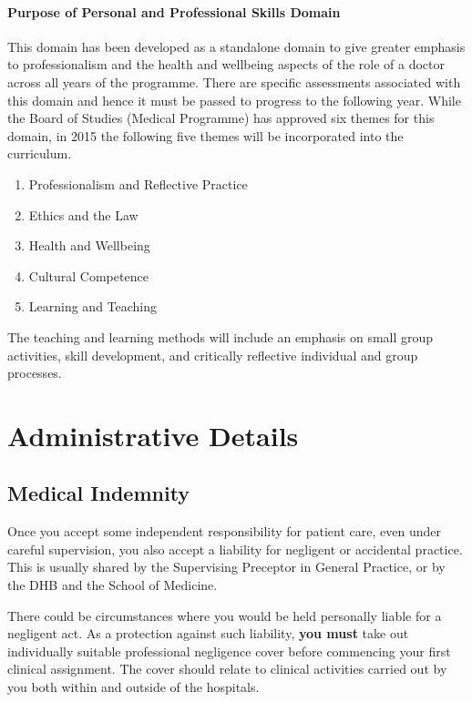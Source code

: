 \documentclass[11pt,fleqn]{book} %
\begin{document}
\subsubsection{Purpose of Personal and Professional Skills Domain}
This domain has been developed as a standalone domain to give greater emphasis to professionalism and the health and wellbeing aspects of the role of a doctor across all years of the programme.  There are specific assessments associated with this domain and hence it must be passed to progress to the following year.  While the Board of Studies (Medical Programme) has approved six themes for this domain, in 2015 the following five themes will be incorporated into the curriculum.
\begin{enumerate}
\item Professionalism and Reflective Practice
\item Ethics and the Law
\item Health and Wellbeing
\item Cultural Competence
\item Learning and Teaching
\end{enumerate}
The teaching and learning methods will include an emphasis on small group activities, skill development, and critically reflective individual and group processes.



\chapter{Administrative Details}

\section{Medical Indemnity}
Once you accept some independent responsibility for patient care, even under careful supervision, you also accept a liability for negligent or accidental practice.  This is usually shared by the Supervising Preceptor in General Practice, or by the DHB and the School of Medicine.

There could be circumstances where you would be held personally liable for a negligent act.  As a protection against such liability, \textbf{you must} take out individually suitable professional negligence cover before commencing your first clinical assignment.  The cover should relate to clinical activities carried out by you both within and outside of the hospitals.
\end{document}
